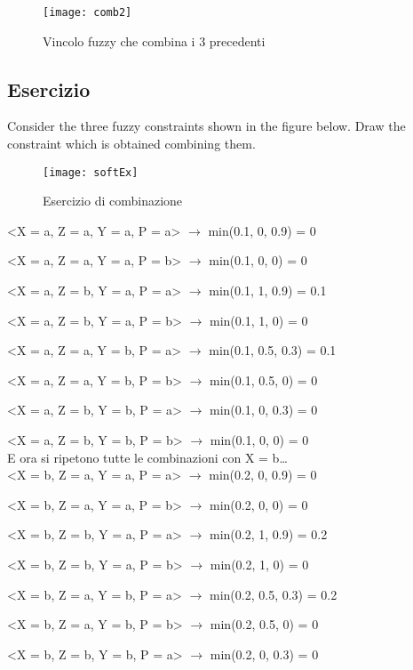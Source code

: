 \begin{figure}[H]
\centering
\texttt{[image: comb2]}
\caption{Vincolo fuzzy che combina i 3 precedenti}
\label{fig:comb2}
\end{figure}

\subsection{Esercizio}

Consider the three fuzzy constraints shown in the figure below.
Draw the constraint which is obtained combining them.

\begin{figure}[H]
\centering
\texttt{[image: softEx]}
\caption{Esercizio di combinazione}
\label{fig:comb2}
\end{figure}

<X = a, Z = a, Y = a, P = a> $\rightarrow$ min(0.1, 0, 0.9) = 0

<X = a, Z = a, Y = a, P = b> $\rightarrow$ min(0.1, 0, 0) = 0

<X = a, Z = b, Y = a, P = a> $\rightarrow$ min(0.1, 1, 0.9) = 0.1

<X = a, Z = b, Y = a, P = b> $\rightarrow$ min(0.1, 1, 0) = 0

<X = a, Z = a, Y = b, P = a> $\rightarrow$ min(0.1, 0.5, 0.3) = 0.1

<X = a, Z = a, Y = b, P = b> $\rightarrow$ min(0.1, 0.5, 0) = 0

<X = a, Z = b, Y = b, P = a> $\rightarrow$ min(0.1, 0, 0.3) = 0

<X = a, Z = b, Y = b, P = b> $\rightarrow$ min(0.1, 0, 0) = 0\\

E ora si ripetono tutte le combinazioni con X = b\dots\\

<X = b, Z = a, Y = a, P = a> $\rightarrow$ min(0.2, 0, 0.9) = 0

<X = b, Z = a, Y = a, P = b> $\rightarrow$ min(0.2, 0, 0) = 0

<X = b, Z = b, Y = a, P = a> $\rightarrow$ min(0.2, 1, 0.9) = 0.2

<X = b, Z = b, Y = a, P = b> $\rightarrow$ min(0.2, 1, 0) = 0

<X = b, Z = a, Y = b, P = a> $\rightarrow$ min(0.2, 0.5, 0.3) = 0.2

<X = b, Z = a, Y = b, P = b> $\rightarrow$ min(0.2, 0.5, 0) = 0

<X = b, Z = b, Y = b, P = a> $\rightarrow$ min(0.2, 0, 0.3) = 0


